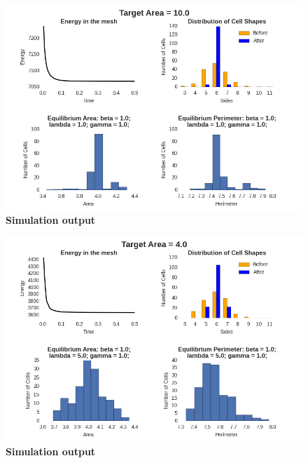\begin{figure}
\centering
\includegraphics[height=0.4\textheight]{../diagrams/graphs4.png}
\caption[\textbf{Simulation output.}]{\textbf{Simulation output}}
\label{fig:g1}
\end{figure}

\begin{figure}
\centering
\includegraphics[height=0.4\textheight]{../diagrams/graphs2.png}
\caption{\textbf{Simulation output}}
\label{fig:g2}
\end{figure}

